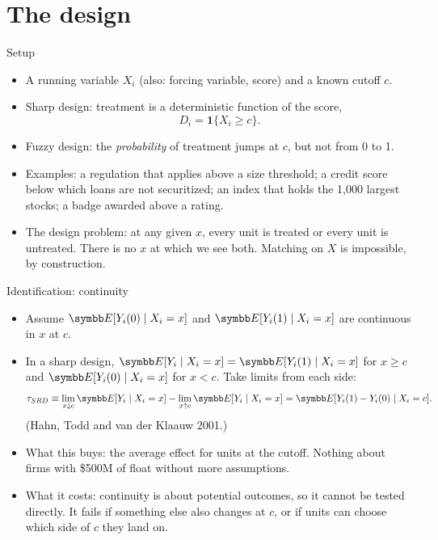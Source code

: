 \documentclass[aspectratio=169,11pt]{beamer}
\begin{document}
\section{The design}

\begin{frame}{Setup}
\begin{itemize}
	\item A \alert{running variable} $X_i$ (also: forcing variable, score) and a known \alert{cutoff} $c$.
	\medskip
	\item \alert{Sharp} design: treatment is a deterministic function of the score,
	\[
		D_i = \mathbf{1}\{X_i \ge c\}.
	\]
	\item \alert{Fuzzy} design: the \emph{probability} of treatment jumps at $c$, but not from 0 to 1.
	\medskip
	\item Examples: a regulation that applies above a size threshold; a credit score below which loans are
	not securitized; an index that holds the 1,000 largest stocks; a badge awarded above a rating.
	\medskip
	\item The design problem: at any given $x$, every unit is treated or every unit is untreated. There is no
	$x$ at which we see both. Matching on $X$ is impossible, by construction.
\end{itemize}
\end{frame}


\begin{frame}{Identification: continuity}
\begin{itemize}
	\item Assume $\E[Y_i(0) \mid X_i = x]$ and $\E[Y_i(1) \mid X_i = x]$ are \alert{continuous} in $x$ at $c$.
	\item In a sharp design, $\E[Y_i \mid X_i = x] = \E[Y_i(1) \mid X_i = x]$ for $x \ge c$ and
	$\E[Y_i(0) \mid X_i = x]$ for $x < c$. Take limits from each side:
	\[
		\tau_{SRD} \equiv \lim_{x \downarrow c} \E[Y_i \mid X_i = x] - \lim_{x \uparrow c} \E[Y_i \mid X_i = x]
		= \E[Y_i(1) - Y_i(0) \mid X_i = c].
	\]
	(Hahn, Todd and van der Klaauw 2001.)
	\medskip
	\item What this buys: the average effect \alert{for units at the cutoff}. Nothing about firms with \$500M of
	float without more assumptions.
	\medskip
	\item What it costs: continuity is about potential outcomes, so it cannot be tested directly. It fails if
	something else also changes at $c$, or if units can choose which side of $c$ they land on.
\end{itemize}
\end{frame}
\end{document}
